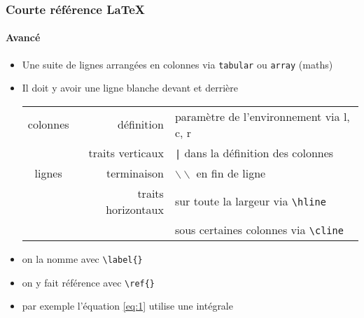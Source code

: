 \begin{frame}[fragile]
  \frametitle{Courte référence \LaTeX{}}
  \framesubtitle{Avancé}


  \begin{itemize}
  \item Une suite de lignes arrangées en colonnes via \verb|tabular| ou \verb|array| (maths)
  \item Il doit y avoir une ligne blanche devant et derrière
    
    \begin{tabular}{|c|r|l|}
      \firsthline
      colonnes & définition         & paramètre de l'environnement via l, c, r  \\ \cline{2-3}
               & traits verticaux   & \verb!|! dans la définition des colonnes  \\ \hline
      lignes   & terminaison        & $\backslash\backslash$ en fin de ligne    \\ \cline{2-3}
               & traits horizontaux & sur toute la largeur via \verb|\hline|    \\ \cline{2-3}
               &                    & sous certaines colonnes via \verb|\cline| \\ \hline
    \end{tabular}
  \end{itemize}


  \begin{itemize}
  \item on la nomme avec \verb|\label{}|
  \item on y fait référence avec \verb|\ref{}|
  \item par exemple l'équation \ref{eq:1} utilise une intégrale
  \end{itemize}
\end{frame}


